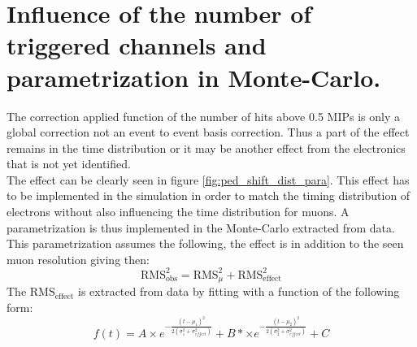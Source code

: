 \chapter{Influence of the number of triggered channels and parametrization in Monte-Carlo.}
\label{appendix:ped_shift}

The correction applied function of the number of hits above 0.5 MIPs is only a global correction not an event to event basis correction. Thus a part of the effect remains in the time distribution or it may be another effect from the electronics that is not yet identified.\\
The effect can be clearly seen in figure \ref{fig:ped_shift_dist_para}. This effect has to be implemented in the simulation in order to match the timing distribution of electrons without also influencing the time distribution for muons. A parametrization is thus implemented in the Monte-Carlo extracted from data. This parametrization assumes the following, the effect is in addition to the seen muon resolution giving then:
\begin{equation*}
	\text{RMS}_{\text{obs}}^2 = \text{RMS}_{\mu}^2 + \text{RMS}_{\text{effect}}^2
\end{equation*}
The $\text{RMS}_{\text{effect}}$ is extracted from data by fitting with a function of the following form:
\begin{equation*}
	f(t) = A \times e^{-\frac{(t-\mu_1)^2}{2(\sigma_1^2 + \sigma_{effect}^2)}} + B* \times e^{-\frac{(t-\mu_2)^2}{2(\sigma_2^2 + \sigma_{effect}^2)}} + C
\end{equation*}


